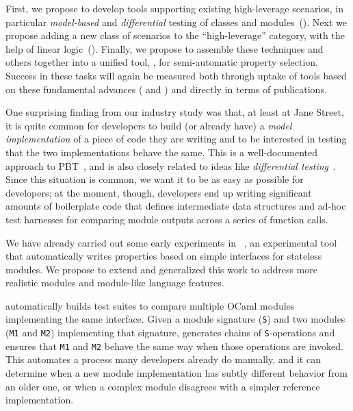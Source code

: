 First, we
propose to develop tools
supporting existing high-leverage scenarios, in particular {\em
model-based} and {\em differential} testing of classes and
modules~(). Next we propose
adding a new class of scenarios to the ``high-leverage'' category, with the
help of linear logic~(). Finally, we propose
to assemble these
techniques and others together into a unified tool, {\em \GhostChat}, for
semi-automatic property selection.
%
Success in these tasks will again be measured both through
uptake of
tools based on these fundamental advances ( and
) and directly in terms of publications.

%
One surprising finding from our industry study was that, at least at
Jane Street,
it is quite common for developers to build (or already have) a {\em
model implementation} of a piece of code they are writing and to be
interested in testing that the two
implementations behave the same.  This is a well-documented approach to
PBT~\cite{hughes_experiences_2016}, and is also closely related to ideas like
{\em differential testing}~\cite{mckeeman1998differential}.
%
Since this situation is common, we want it to be as easy as possible
for developers; at the moment, though, developers end up writing
significant amounts of boilerplate code that defines intermediate data
structures and ad-hoc test harnesses for comparing module outputs across a
series of function calls.

We have already carried out some early experiments in
{\Mica}~\cite{Ng2023MicaPoster}, an experimental tool that automatically
writes properties based on simple interfaces for stateless modules.
We propose to extend and generalized this work to address more
realistic modules and module-like language features.


{\Mica} automatically builds test suites to compare multiple OCaml
modules implementing the same interface. Given a module signature
(\lstinline{S}) and two modules
(\lstinline{M1} and \lstinline{M2}) implementing that signature, {\Mica}
generates chains of \lstinline{S}-operations and ensures that
\lstinline{M1} and \lstinline{M2} behave the same way when those operations are
invoked. This automates a process many developers already do manually,
and it can
determine when a new module implementation has subtly different
behavior from an older one, or when a
complex module disagrees with a simpler reference implementation.

